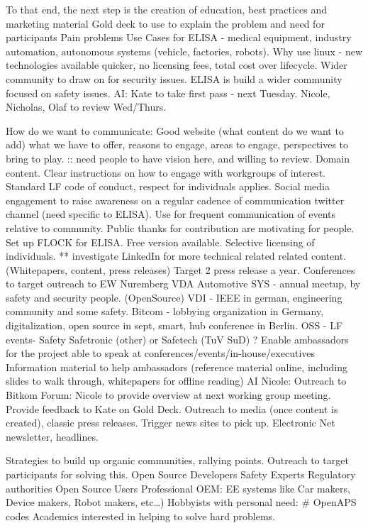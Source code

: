 \documentclass[12pt]{../Common_files/ElisaPaper}
\begin{document}
To that end, the next step is the creation of education, best practices and marketing material
Gold deck to use to explain the problem and need for participants
Pain problems
Use Cases for ELISA - medical equipment, industry automation,  autonomous systems (vehicle, factories, robots).   
Why use linux - new technologies available quicker,  no licensing fees, total cost over lifecycle.
Wider community to draw on for security issues.
ELISA is build a wider community focused on safety issues.
AI:  Kate to take first pass - next Tuesday.
Nicole, Nicholas, Olaf to review Wed/Thurs.  

How do we want to communicate:
Good website (what content do we want to add)
what we have to offer,  reasons to engage, areas to engage,  perspectives to bring to play. :: need people to have vision here, and willing to review.
Domain content.
Clear instructions on how to engage with workgroups of interest.
Standard LF code of conduct,  respect for individuals applies.
Social media engagement to raise awareness 
on a regular cadence of communication twitter channel (need specific to ELISA).
Use for frequent communication of events relative to community.
Public thanks for contribution are motivating for people.   
Set up FLOCK for ELISA.
Free version available.
Selective licensing of individuals.
** investigate
LinkedIn for more technical related related content.
(Whitepapers, content, press releases)
Target 2 press release a year.
Conferences to target outreach to 
EW Nuremberg
VDA Automotive SYS - annual meetup, by safety and security people.  (OpenSource)
VDI - IEEE in german,  engineering community and some safety.
Bitcom - lobbying organization in Germany,  digitalization,  open source in sept,  smart,  hub conference in Berlin. 
OSS - LF events- Safety
Safetronic (other) or Safetech (TuV SuD)
?
Enable ambassadors for the project able to speak at conferences/events/in-house/executives 
Information material to help ambassadors (reference material online, including slides to walk through, whitepapers for offline reading)
AI Nicole: Outreach to Bitkom Forum:  Nicole to provide overview at next working group meeting.
Provide feedback to Kate on Gold Deck.
Outreach to media (once content is created),  classic press releases.
Trigger news sites to pick up.
Electronic Net newsletter,  headlines.


Strategies to build up organic communities,  rallying points.
Outreach to target participants for solving this.
Open Source Developers 
Safety Experts
Regulatory authorities
Open Source Users 
Professional OEM:  EE systems like  Car makers, Device makers, Robot makers, etc…)
Hobbyists with personal need:  \# OpenAPS codes
Academics interested in helping to solve hard problems.
\end{document}
